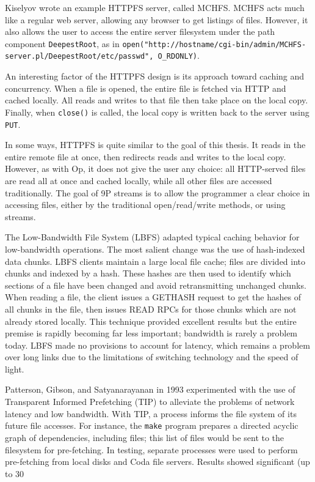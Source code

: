 \documentclass[12pt,american]{report}
\begin{document}
Kiselyov wrote an example HTTPFS server, called MCHFS. MCHFS acts much like a regular web server, allowing any browser to get listings of files. However, it also allows the user to access the entire server filesystem under the path component {\tt DeepestRoot}, as in {\tt open("http://hostname/cgi-bin/admin/MCHFS-server.pl\linebreak/DeepestRoot/etc/passwd", O\_RDONLY)}\cite{HTTPFS}.

An interesting factor of the HTTPFS design is its approach toward caching and concurrency. When a file is opened, the entire file is fetched via HTTP and cached locally. All reads and writes to that file then take place on the local copy. Finally, when {\tt close()} is called, the local copy is written back to the server using {\tt PUT}.

In some ways, HTTPFS is quite similar to the goal of this thesis. It reads in the entire remote file at once, then redirects reads and writes to the local copy. However, as with Op, it does not give the user any choice: all HTTP-served files are read all at once and cached locally, while all other files are accessed traditionally. The goal of 9P streams is to allow the programmer a clear choice in accessing files, either by the traditional open/read/write methods, or using streams.

The Low-Bandwidth File System (LBFS) adapted typical caching behavior for low-bandwidth operations. The most salient change was the use of hash-indexed data chunks. LBFS clients maintain a large local file cache; files are divided into chunks and indexed by a hash. These hashes are then used to identify which sections of a file have been changed and avoid retransmitting unchanged chunks. When reading a file, the client issues a GETHASH request to get the hashes of all chunks in the file, then issues READ RPCs for those chunks which are not already stored locally. This technique provided excellent results but the entire premise is rapidly becoming far less important; bandwidth is rarely a problem today. LBFS made no provisions to account for latency, which remains a problem over long links due to the limitations of switching technology and the speed of light.

Patterson, Gibson, and Satyanarayanan in 1993 experimented with the use of Transparent Informed Prefetching (TIP) to alleviate the problems of network latency and low bandwidth. With TIP, a process informs the file system of its future file accesses. For instance, the {\tt make} program prepares a directed acyclic graph of dependencies, including files; this list of files would be sent to the filesystem for pre-fetching. In testing, separate processes were used to perform pre-fetching from local disks and Coda file servers. Results showed significant (up to 30%
\end{document}
